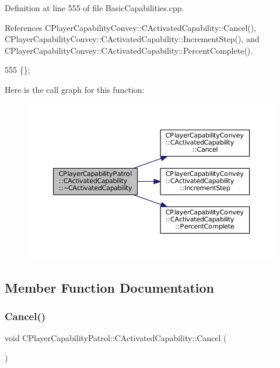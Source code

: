 Definition at line 555 of file Basic\+Capabilities.\+cpp.



References C\+Player\+Capability\+Convey\+::\+C\+Activated\+Capability\+::\+Cancel(), C\+Player\+Capability\+Convey\+::\+C\+Activated\+Capability\+::\+Increment\+Step(), and C\+Player\+Capability\+Convey\+::\+C\+Activated\+Capability\+::\+Percent\+Complete().


\begin{DoxyCode}
555 \{\};
\end{DoxyCode}
Here is the call graph for this function\+:\nopagebreak
\begin{figure}[H]
\begin{center}
\leavevmode
\includegraphics[width=350pt]{classCPlayerCapabilityPatrol_1_1CActivatedCapability_a2ad25677321b38e90d4e94abb0401aab_cgraph}
\end{center}
\end{figure}


\subsection{Member Function Documentation}
\hypertarget{classCPlayerCapabilityPatrol_1_1CActivatedCapability_a36165c232eb283ce4a92bd4606480c73}{}\label{classCPlayerCapabilityPatrol_1_1CActivatedCapability_a36165c232eb283ce4a92bd4606480c73} 
\subsubsection{\texorpdfstring{Cancel()}{Cancel()}}
{\footnotesize\ttfamily void C\+Player\+Capability\+Patrol\+::\+C\+Activated\+Capability\+::\+Cancel (\begin{DoxyParamCaption}{ }\end{DoxyParamCaption})\hspace{0.3cm}{\ttfamily [virtual]}}



